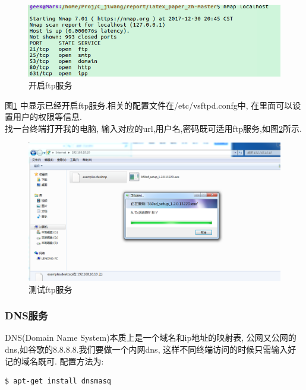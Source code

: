 \begin{figure}[thbp!]
\centering
\includegraphics[width=0.9\linewidth]{figure/linux_ftp_start.png}
\caption{ 开启ftp服务}
\label{fig:linux_ftp_start}
\end{figure}
	
\indent	图\ref{fig:linux_ftp_start}	中显示已经开启ftp服务.相关的配置文件在/etc/vsftpd.confg中, 在里面可以设置用户的权限等信息.\\
\indent 找一台终端打开我的电脑, 输入对应的url,用户名,密码既可适用ftp服务,如图\ref{fig:linux_ftp_test}所示.
	\begin{figure}[thbp!]
\centering
\includegraphics[width=0.9\linewidth]{figure/linux_ftp_test.png}
\caption{ 测试ftp服务}
\label{fig:linux_ftp_test}
\end{figure}
	\subsubsection{DNS服务}
	DNS(Domain Name System)本质上是一个域名和ip地址的映射表, 公网又公网的dns,如谷歌的8.8.8.8.我们要做一个内网dns, 这样不同终端访问的时候只需输入好记的域名既可.
	配置方法为:
\begin{lstlisting}[language=bash]
	$ apt-get install dnsmasq
\end{lstlisting}

